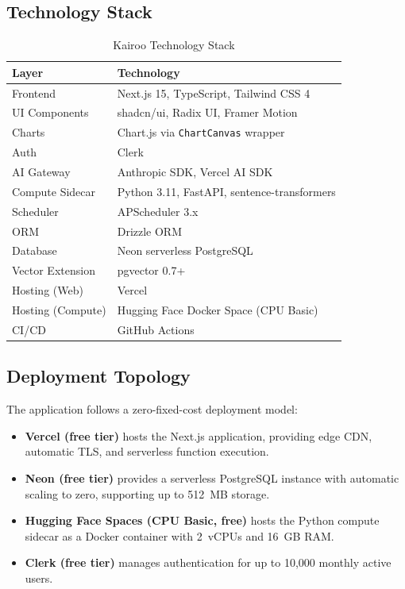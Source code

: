 \documentclass[conference]{IEEEtran}
\begin{document}
\subsection{Technology Stack}

\begin{table}[htbp]
\caption{Kairoo Technology Stack}
\label{tab:stack}
\centering
\begin{tabular}{ll}
\toprule
\textbf{Layer} & \textbf{Technology} \\
\midrule
Frontend          & Next.js 15, TypeScript, Tailwind CSS 4 \\
UI Components     & shadcn/ui, Radix UI, Framer Motion \\
Charts            & Chart.js via \texttt{ChartCanvas} wrapper \\
Auth              & Clerk \\
AI Gateway        & Anthropic SDK, Vercel AI SDK \\
Compute Sidecar   & Python 3.11, FastAPI, sentence-transformers \\
Scheduler         & APScheduler 3.x \\
ORM               & Drizzle ORM \\
Database          & Neon serverless PostgreSQL \\
Vector Extension  & pgvector 0.7+ \\
Hosting (Web)     & Vercel \\
Hosting (Compute) & Hugging Face Docker Space (CPU Basic) \\
CI/CD             & GitHub Actions \\
\bottomrule
\end{tabular}
\end{table}

\subsection{Deployment Topology}

The application follows a zero-fixed-cost deployment model:

\begin{itemize}
  \item \textbf{Vercel (free tier)} hosts the Next.js application, providing
        edge CDN, automatic TLS, and serverless function execution.
  \item \textbf{Neon (free tier)} provides a serverless PostgreSQL instance
        with automatic scaling to zero, supporting up to 512~MB storage.
  \item \textbf{Hugging Face Spaces (CPU Basic, free)} hosts the Python
        compute sidecar as a Docker container with 2~vCPUs and 16~GB RAM.
  \item \textbf{Clerk (free tier)} manages authentication for up to 10,000
        monthly active users.
\end{itemize}
\end{document}
